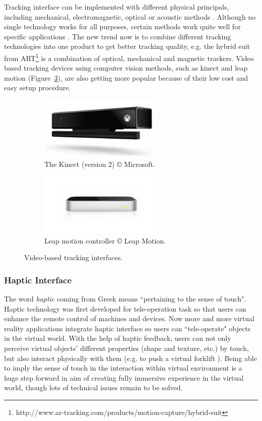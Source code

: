 Tracking interface can be implemented with different physical principals, including mechanical, electromagnetic, optical or acoustic methods \citep{Meyer1992Survey}. Although no single technology works for all purposes, certain methods work quite well for specific applications \citep{Welch2002Survey}. The new trend now is to combine different tracking technologies into one product to get better tracking quality, e.g. the hybrid suit from ART\footnote{http://www.ar-tracking.com/products/motion-capture/hybrid-suit} is a combination of optical, mechanical and magnetic trackers. Video based tracking devices using computer vision methods, such as kinect and leap motion (Figure~\ref{fig:1_video_tracking}), are also getting more popular because of their low cost and easy setup procedure.

\begin{figure}[htb]
  \begin{subfigure}{.5\textwidth}
    \centering
    \includegraphics[height=3cm]{figures/ch1/kinect}
    \caption{The Kinect (version 2) \copyright{} Microsoft.}
    \label{fig:1_video_tracking:kinect}
  \end{subfigure}
  \begin{subfigure}{.5\textwidth}
    \centering
    \includegraphics[height=3cm]{figures/ch1/leap}
    \caption{Leap motion controller \copyright{} Leap Motion.}
    \label{fig:1_video_tracking:leap}
  \end{subfigure}
  \caption{\label{fig:1_video_tracking}Video-based tracking interfaces.}
\end{figure}

\subsubsection{Haptic Interface}
The word \textit{haptic} coming from Greek means ``pertaining to the sense of touch". Haptic technology was first developed for tele-operation task so that users can enhance the remote control of machines and devices. Now more and more virtual reality applications integrate haptic interface so users can ``tele-operate" objects in the virtual world. With the help of haptic feedback, users can not only perceive virtual objects' different properties (shape and texture, etc.) by touch, but also interact physically with them (e.g. to push a virtual forklift \citep{Martin2012Forklift}). Being able to imply the sense of touch in the interaction within virtual environment is a huge step forward in aim of creating fully immersive experience in the virtual world, though lots of technical issues remain to be solved. 

